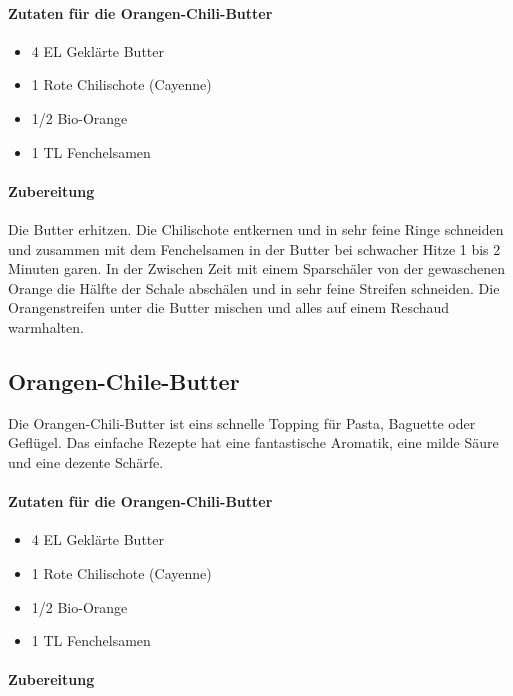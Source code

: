 \paragraph{Zutaten für die Orangen-Chili-Butter}

\begin{itemize}[noitemsep]
	\item 4 EL Geklärte Butter
	\item 1 Rote Chilischote (Cayenne)
	\item 1/2 Bio-Orange
	\item 1 TL Fenchelsamen
\end{itemize}

\paragraph{Zubereitung}

Die Butter erhitzen. Die Chilischote entkernen und in sehr feine Ringe schneiden 
und zusammen 
mit dem Fenchelsamen in der Butter bei 
schwacher Hitze 1 bis 2 Minuten garen. In der Zwischen Zeit mit einem 
Sparschäler von der 
gewaschenen Orange die Hälfte der Schale 
abschälen und in sehr feine Streifen schneiden. Die Orangenstreifen unter die 
Butter mischen 
und alles auf einem Reschaud warmhalten.

\subsection{Orangen-Chile-Butter}

Die Orangen-Chili-Butter ist eins schnelle Topping für Pasta, Baguette oder 
Geflügel. Das 
einfache Rezepte hat eine fantastische 
Aromatik, eine milde Säure und eine dezente Schärfe.

\paragraph{Zutaten für die Orangen-Chili-Butter}\label{OrangenChili}

\begin{itemize}[noitemsep]
	\item 4 EL Geklärte Butter
	\item 1 Rote Chilischote (Cayenne)
	\item 1/2 Bio-Orange
	\item 1 TL Fenchelsamen
\end{itemize}

\paragraph{Zubereitung}


